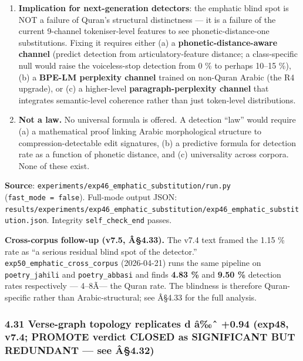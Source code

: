 \documentclass[
]{article}
\begin{document}
\begin{enumerate}
  under emphatic swaps) rather than Quran-specific.'' \textbf{exp50
  (v7.5, Â§4.33) refutes this speculation}: the same R1 pipeline on
  \texttt{poetry\_jahili} and \texttt{poetry\_abbasi} yields 9.50 \% and
  4.83 \% detection rates, 4--8Ã--- the Quran's 1.15 \%. The
  emphatic-detection gap is therefore a \textbf{Quran-specific}
  structural property, not an Arabic-morphology artefact. The v7.4
  statement is retracted; see Â§4.33.
\item
  \textbf{Implication for next-generation detectors}: the emphatic blind
  spot is NOT a failure of Quran's structural distinctness --- it is a
  failure of the current 9-channel tokeniser-level features to see
  phonetic-distance-one substitutions. Fixing it requires either (a) a
  \textbf{phonetic-distance-aware channel} (predict detection from
  articulatory-feature distance; a class-specific null would raise the
  voiceless-stop detection from 0 \% to perhaps 10--15 \%), (b) a
  \textbf{BPE-LM perplexity channel} trained on non-Quran Arabic (the R4
  upgrade), or (c) a higher-level \textbf{paragraph-perplexity channel}
  that integrates semantic-level coherence rather than just token-level
  distributions.
\item
  \textbf{Not a law.} No universal formula is offered. A detection
  ``law'' would require (a) a mathematical proof linking Arabic
  morphological structure to compression-detectable edit signatures, (b)
  a predictive formula for detection rate as a function of phonetic
  distance, and (c) universality across corpora. None of these exist.
\end{enumerate}

\textbf{Source}:
\texttt{experiments/exp46\_emphatic\_substitution/run.py}
(\texttt{fast\_mode\ =\ false}). Full-mode output JSON:
\texttt{results/experiments/exp46\_emphatic\_substitution/exp46\_emphatic\_substitution.json}.
Integrity \texttt{self\_check\_end} passes.

\textbf{Cross-corpus follow-up (v7.5, Â§4.33).} The v7.4 text framed the
1.15 \% rate as ``a serious residual blind spot of the detector.''
\texttt{exp50\_emphatic\_cross\_corpus} (2026-04-21) runs the same
pipeline on \texttt{poetry\_jahili} and \texttt{poetry\_abbasi} and
finds \textbf{4.83 \%} and \textbf{9.50 \%} detection rates respectively
--- 4--8Ã--- the Quran rate. The blindness is therefore Quran-specific
rather than Arabic-structural; see Â§4.33 for the full analysis.

\subsubsection{4.31 Verse-graph topology replicates d â‰ˆ +0.94 (exp48,
v7.4; PROMOTE verdict CLOSED as SIGNIFICANT BUT REDUNDANT --- see
Â§4.32)}\label{verse-graph-topology-replicates-d-uxe2ux2c6-0.94-exp48-v7.4-promote-verdict-closed-as-significant-but-redundant-see-uxe24.32}
\end{document}
